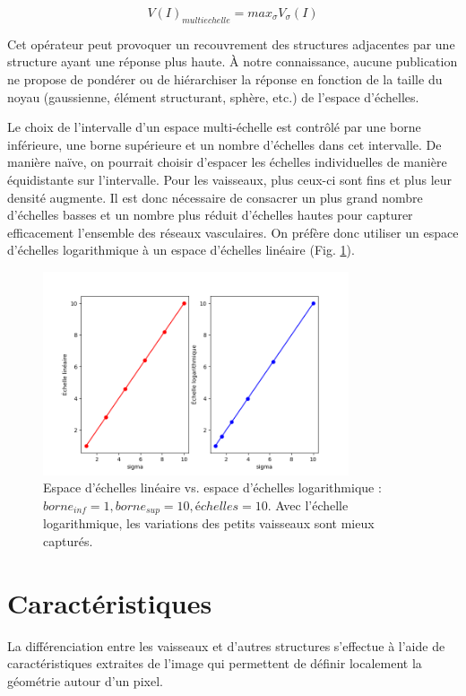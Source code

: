   \begin{equation}
    V(I)_{multi echelle} = max_{\sigma}V_{\sigma}(I)
  \end{equation}
  
  Cet opérateur peut provoquer un recouvrement des structures adjacentes par une structure ayant une réponse plus haute. À notre connaissance, aucune publication ne propose de pondérer ou de hiérarchiser la réponse en fonction de la taille du noyau (gaussienne, élément structurant, sphère, etc.) de l'espace d'échelles.

  Le choix de l'intervalle d'un espace multi-échelle est contrôlé par une borne inférieure, une borne supérieure et un nombre d'échelles dans cet intervalle. De manière naïve, on pourrait choisir d'espacer les échelles individuelles de manière équidistante sur l'intervalle. Pour les vaisseaux, plus ceux-ci sont fins et plus leur densité augmente. Il est donc nécessaire de consacrer un plus grand nombre d'échelles basses et un nombre plus réduit d'échelles hautes pour capturer efficacement l'ensemble des réseaux vasculaires. On préfère donc utiliser un espace d'échelles logarithmique à un espace d'échelles linéaire (Fig. \ref{fig:scale_space}).

  \begin{figure}[h]
    \centering
    \includegraphics[height=6cm]{Images/scale_space.png}
    \caption{Espace d'échelles linéaire vs. espace d'échelles logarithmique : $borne_{inf}=1,borne_{sup}=10,échelles=10$. Avec l'échelle logarithmique, les variations des petits vaisseaux sont mieux capturés.}
    \label{fig:scale_space}
  \end{figure}

\section{Caractéristiques}

La différenciation entre les vaisseaux et d'autres structures s'effectue à l'aide de caractéristiques extraites de l'image qui permettent de définir localement la géométrie autour d'un pixel. 

